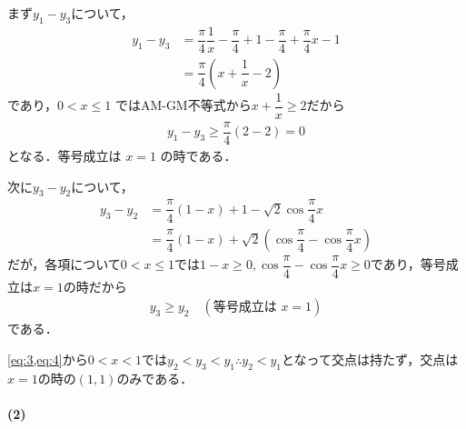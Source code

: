 \documentclass[../../main.tex]{subfiles}
\begin{document}
まず$y_1-y_3$について，
\begin{align}
  y_1 - y_3
  &= \dfrac{\pi}{4}\dfrac{1}{x} - \dfrac{\pi}{4} + 1 - \dfrac{\pi}{4} + \dfrac{\pi}{4}x - 1 \\
  &= \dfrac{\pi}{4}\left(x + \dfrac{1}{x} - 2\right)
\end{align}
であり，$0 < x \le 1$ ではAM-GM不等式から$x+\dfrac{1}{x} \ge 2$だから
\begin{align}
  y_1 - y_3 \ge \dfrac{\pi}{4}(2-2) = 0 \label{eq:3}
\end{align}
となる．等号成立は $x=1$ の時である．

次に$y_3-y_2$について，
\begin{align}
  y_3 - y_2
  & = \dfrac{\pi}{4}(1-x) + 1 - \sqrt{2}\cos\dfrac{\pi}{4}x \\
  & = \dfrac{\pi}{4}(1-x) + \sqrt{2}\left(\cos\dfrac{\pi}{4} - \cos\dfrac{\pi}{4}x\right)
\end{align}
だが，各項について$0 < x \le 1$では$1-x \ge 0, \cos\dfrac{\pi}{4} - \cos\dfrac{\pi}{4}x \ge 0$であり，等号成立は$x=1$の時だから
\begin{align}
  y_3 \ge y_2 \quad (\text{等号成立は } x=1) \label{eq:4}
\end{align}
である．

\cref{eq:3,eq:4}から$0<x<1$では$y_2 < y_3 < y_1 \therefore y_2 < y_1 $となって交点は持たず，交点は$x=1$の時の$(1,1)$のみである．

\paragraph{(2)}
\end{document}
